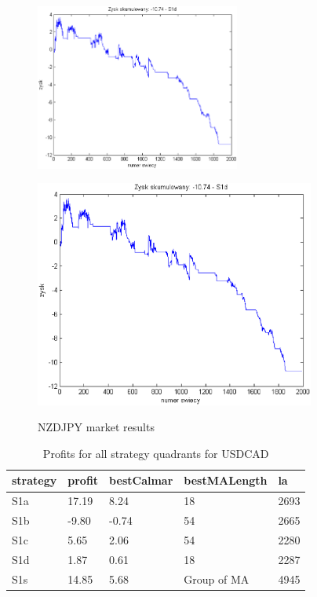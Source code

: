 \documentclass{tewiart}
\begin{document}
\begin{figure}[h]
\begin{minipage}{\linewidth}
\label{cztero}
\end{minipage}
\begin{minipage}{\linewidth}
\centering
\includegraphics[width=0.6\textwidth]{images/nzdjpyS1d.eps}
\label{mansard}
\end{minipage}
\begin{minipage}{.49\linewidth}
\centering
\includegraphics[width=0.82\textwidth]{images/nzdjpyS1s.eps}
\label{mansard}
\end{minipage}
\caption{NZDJPY market results}
\end{figure}
\newpage
\begin{table}[!t]
\caption{Profits for all strategy quadrants for USDCAD}
 \begin{center}
 \begin{tabular}{|l|l|l|l|l|}
 \hline \textbf{strategy} & \textbf{profit} & \textbf{bestCalmar} & \textbf{bestMALength} & \textbf{la} \\ \hline
S1a & 17.19 & 8.24 & 18 & 2693\\ \hline
S1b & -9.80 & -0.74 & 54 & 2665\\ \hline
S1c & 5.65 & 2.06 & 54 & 2280\\ \hline
S1d & 1.87 & 0.61 & 18 & 2287\\ \hline
S1s & 14.85 & 5.68 & Group of MA & 4945\\
\hline \end{tabular}
 \end{center}
 \end{table}
\end{document}
